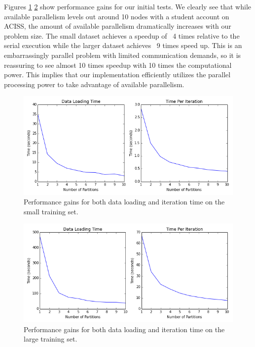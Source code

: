 Figures \ref{fig:small} \ref{fig:big} show performance gains for our initial tests.  We clearly see that while available parallelism levels out around 10 nodes with a student account on ACISS, the amount of available parallelism dramatically increases with our problem size.  The small dataset achieves a speedup of ~4 times relative to the serial execution while the larger dataset achieves ~9 times speed up.  This is an embarrassingly parallel problem with limited communication demands, so it is reassuring to see almost 10 times speedup with 10 times the computational power.  This implies that our implementation efficiently utilizes the parallel processing power to take advantage of available parallelism.

\begin{figure}[h]
\begin{center}
\includegraphics[scale=0.7]{small_metrics.png}
\caption{Performance gains for both data loading and iteration time on the small training set.}
\label{fig:small}
\end{center}
\end{figure}

\begin{figure}[h]
\begin{center}
\includegraphics[scale=0.7]{big_metrics.png}
\caption{Performance gains for both data loading and iteration time on the large training set.}
\label{fig:big}
\end{center}
\end{figure}
